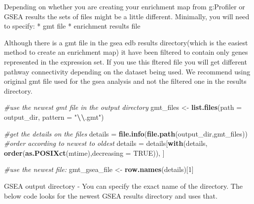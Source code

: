 \documentclass[
]{book}
\newenvironment{Shaded}{\begin{snugshade}}{\end{snugshade}}
\newcommand{\AttributeTok}[1]{\textcolor[rgb]{0.13,0.29,0.53}{#1}}
\newcommand{\CommentTok}[1]{\textcolor[rgb]{0.56,0.35,0.01}{\textit{#1}}}
\newcommand{\ConstantTok}[1]{\textcolor[rgb]{0.56,0.35,0.01}{#1}}
\newcommand{\DecValTok}[1]{\textcolor[rgb]{0.00,0.00,0.81}{#1}}
\newcommand{\FunctionTok}[1]{\textcolor[rgb]{0.13,0.29,0.53}{\textbf{#1}}}
\newcommand{\NormalTok}[1]{#1}
\newcommand{\OtherTok}[1]{\textcolor[rgb]{0.56,0.35,0.01}{#1}}
\newcommand{\SpecialCharTok}[1]{\textcolor[rgb]{0.81,0.36,0.00}{\textbf{#1}}}
\newcommand{\StringTok}[1]{\textcolor[rgb]{0.31,0.60,0.02}{#1}}
\begin{document}
Depending on whether you are creating your enrichment map from g:Profiler or GSEA results the sets of files might be a little different. Minimally, you will need to specify:
* gmt file
* enrichment results file

Although there is a gmt file in the gsea edb results directory(which is the easiest method to create an enrichment map) it have been filtered to contain only genes represented in the expression set. If you use this fltered file you will get different pathway connectivity depending on the dataset being used. We recommend using original gmt file used for the gsea analysis and not the filtered one in the results directory.

\begin{Shaded}
\begin{Highlighting}[]
\CommentTok{\#use the newest gmt file in the output directory}
\NormalTok{gmt\_files }\OtherTok{\textless{}{-}} \FunctionTok{list.files}\NormalTok{(}\AttributeTok{path =}\NormalTok{ output\_dir, }\AttributeTok{pattern =} \StringTok{"}\SpecialCharTok{\textbackslash{}\textbackslash{}}\StringTok{.gmt"}\NormalTok{)}

  \CommentTok{\#get the details on the files}
\NormalTok{  details }\OtherTok{=} \FunctionTok{file.info}\NormalTok{(}\FunctionTok{file.path}\NormalTok{(output\_dir,gmt\_files))}
  \CommentTok{\#order according to newest to oldest}
\NormalTok{  details }\OtherTok{=}\NormalTok{ details[}\FunctionTok{with}\NormalTok{(details, }\FunctionTok{order}\NormalTok{(}\FunctionTok{as.POSIXct}\NormalTok{(mtime),}\AttributeTok{decreasing =} \ConstantTok{TRUE}\NormalTok{)), ]}

  \CommentTok{\#use the newest file:}
\NormalTok{ gmt\_gsea\_file }\OtherTok{\textless{}{-}} \FunctionTok{row.names}\NormalTok{(details)[}\DecValTok{1}\NormalTok{]}
\end{Highlighting}
\end{Shaded}

GSEA output directory - You can specify the exact name of the directory. The below code looks for the newest GSEA results directory and uses that.
\end{document}
